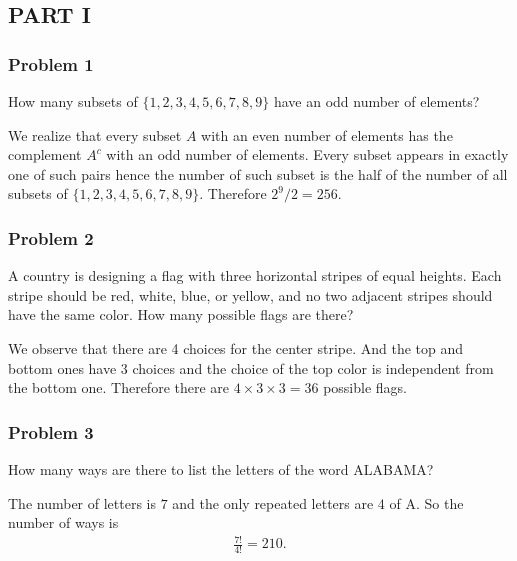 \documentclass[12pt]{article}
\begin{document}
\vspace{-30pt}
\subsection*{PART I}
\subsubsection*{Problem 1}
How many subsets of $\{1,2,3,4,5,6,7,8,9\}$ have an odd number of elements?
\begin{solution}
We realize that every subset $A$ with an even number of elements has the complement $A^c$ with an odd number of elements. Every subset appears in exactly one of such pairs hence the number of such subset is the half of the number of all subsets of $\{1,2,3,4,5,6,7,8,9\}$. Therefore $2^9/2 = 256$.
\end{solution}

\vspace{-50pt}
\subsubsection*{Problem 2}
A country is designing a flag with three horizontal stripes of equal heights. Each stripe should be red, white, blue, or yellow, and no two adjacent stripes should have the same color. How many possible flags are there?
\begin{solution}
We observe that there are 4 choices for the center stripe. And the top and bottom ones have 3 choices and the choice of the top color is independent from the bottom one. Therefore there are $4 \times 3 \times 3 = 36$ possible flags.
\end{solution}

\vspace{-50pt}
\subsubsection*{Problem 3}
How many ways are there to list the letters of the word ALABAMA?
\begin{solution}
The number of letters is $7$ and the only repeated letters are $4$ of A. So the number of ways is 
\begin{align*}
    \frac{7!}{4!} = 210.
\end{align*}
\end{solution}
\end{document}
